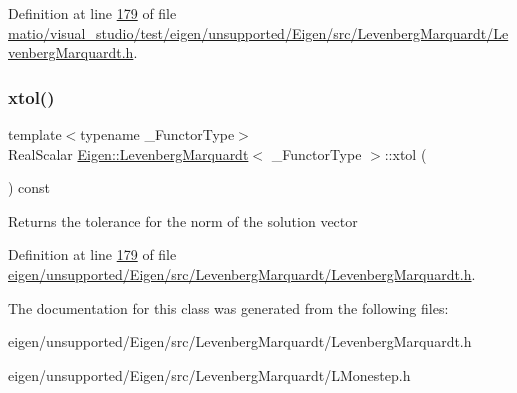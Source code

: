 Definition at line \hyperlink{matio_2visual__studio_2test_2eigen_2unsupported_2_eigen_2src_2_levenberg_marquardt_2_levenberg_marquardt_8h_source_l00179}{179} of file \hyperlink{matio_2visual__studio_2test_2eigen_2unsupported_2_eigen_2src_2_levenberg_marquardt_2_levenberg_marquardt_8h_source}{matio/visual\+\_\+studio/test/eigen/unsupported/\+Eigen/src/\+Levenberg\+Marquardt/\+Levenberg\+Marquardt.\+h}.

\mbox{\label{class_eigen_1_1_levenberg_marquardt_a25a7629ea877d8f08670536b3d234897}} 
\subsubsection{\texorpdfstring{xtol()}{xtol()}\hspace{0.1cm}{\footnotesize\ttfamily [2/2]}}
{\footnotesize\ttfamily template$<$typename \+\_\+\+Functor\+Type$>$ \\
Real\+Scalar \hyperlink{class_eigen_1_1_levenberg_marquardt}{Eigen\+::\+Levenberg\+Marquardt}$<$ \+\_\+\+Functor\+Type $>$\+::xtol (\begin{DoxyParamCaption}{ }\end{DoxyParamCaption}) const\hspace{0.3cm}{\ttfamily [inline]}}

\begin{DoxyReturn}{Returns}
the tolerance for the norm of the solution vector 
\end{DoxyReturn}


Definition at line \hyperlink{eigen_2unsupported_2_eigen_2src_2_levenberg_marquardt_2_levenberg_marquardt_8h_source_l00179}{179} of file \hyperlink{eigen_2unsupported_2_eigen_2src_2_levenberg_marquardt_2_levenberg_marquardt_8h_source}{eigen/unsupported/\+Eigen/src/\+Levenberg\+Marquardt/\+Levenberg\+Marquardt.\+h}.



The documentation for this class was generated from the following files\+:\begin{DoxyCompactItemize}
\item 
eigen/unsupported/\+Eigen/src/\+Levenberg\+Marquardt/\+Levenberg\+Marquardt.\+h\item 
eigen/unsupported/\+Eigen/src/\+Levenberg\+Marquardt/\+L\+Monestep.\+h\end{DoxyCompactItemize}
